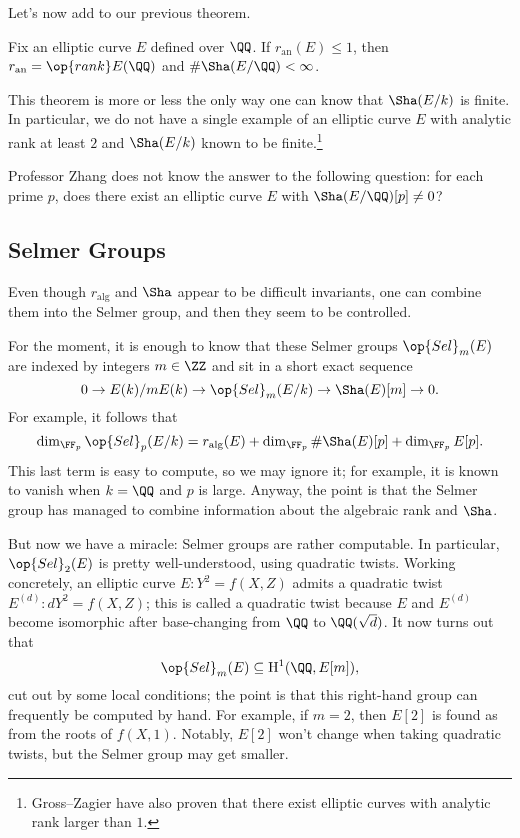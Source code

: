 \documentclass[../notes.tex]{subfiles}
\begin{document}
Let's now add to our previous theorem.
\begin{theorem}
	Fix an elliptic curve $E$ defined over $\QQ$. If $r_{\mathrm{an}}(E)\le1$, then $r_{\mathrm{an}}=\op{rank}E(\QQ)$ and $\#\Sha(E/\QQ)<\infty$.
\end{theorem}
This theorem is more or less the only way one can know that $\Sha(E/k)$ is finite. In particular, we do not have a single example of an elliptic curve $E$ with analytic rank at least $2$ and $\Sha(E/k)$ known to be finite.\footnote{Gross--Zagier have also proven that there exist elliptic curves with analytic rank larger than $1$.}
\begin{remark}
	Professor Zhang does not know the answer to the following question: for each prime $p$, does there exist an elliptic curve $E$ with $\Sha(E/\QQ)[p]\ne0$?
\end{remark}

\subsection{Selmer Groups}
Even though $r_{\mathrm{alg}}$ and $\Sha$ appear to be difficult invariants, one can combine them into the Selmer group, and then they seem to be controlled.

For the moment, it is enough to know that these Selmer groups $\op{Sel}_m(E)$ are indexed by integers $m\in\ZZ$ and sit in a short exact sequence
\[0\to E(k)/mE(k)\to\op{Sel}_m(E/k)\to\Sha(E)[m]\to0.\]
For example, it follows that
\[\dim_{\FF_p}\op{Sel}_p(E/k)=r_{\mathrm{alg}}(E)+\dim_{\FF_p}\#\Sha(E)[p]+\dim_{\FF_p}E[p].\]
This last term is easy to compute, so we may ignore it; for example, it is known to vanish when $k=\QQ$ and $p$ is large. Anyway, the point is that the Selmer group has managed to combine information about the algebraic rank and $\Sha$.

But now we have a miracle: Selmer groups are rather computable. In particular, $\op{Sel}_2(E)$ is pretty well-understood, using quadratic twists. Working concretely, an elliptic curve $E\colon Y^2=f(X,Z)$ admits a quad\-ratic twist $E^{(d)}\colon dY^2=f(X,Z)$; this is called a quadratic twist because $E$ and $E^{(d)}$ become isomorphic after base-changing from $\QQ$ to $\QQ(\sqrt d)$. It now turns out that
\[\op{Sel}_m(E)\subseteq\mathrm H^1(\QQ,E[m]),\]
cut out by some local conditions; the point is that this right-hand group can frequently be computed by hand. For example, if $m=2$, then $E[2]$ is found as from the roots of $f(X,1)$. Notably, $E[2]$ won't change when taking quadratic twists, but the Selmer group may get smaller.
\end{document}
